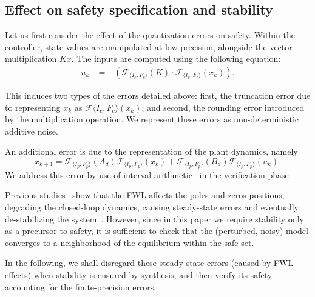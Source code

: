 \documentclass[twocolumn]{autart}    %
\begin{document}
\subsection{Effect on safety specification and stability}

Let us first consider the effect of the quantization errors on safety. 
Within the controller, state values are manipulated at low precision,
alongside the vector multiplication $Kx$.
The inputs are computed using the following equation: 
%
\begin{align*}
u_{k}&=-(\mathcal{F}_{\langle I_c,F_c \rangle}(K)\cdot\mathcal{F}_{\langle I_c,F_c \rangle}(x_{k})). 
\end{align*}

This induces two types of the errors detailed above: first, the truncation
error due to representing $x_k$ as $\mathcal{F}{\langle I_c,F_c
\rangle}(x_{k})$; and second, the rounding error introduced by the
multiplication operation.  We represent these errors as non-deterministic
additive noise.

An additional error is due to the representation of the plant dynamics, namely 
%
{\scriptsize
\begin{equation}
x_{k+1} =\mathcal{F}_{\langle I_p,F_p \rangle}(A_d) \mathcal{F}_{\langle I_p,F_p \rangle}(x_{k}) + \mathcal{F}_{\langle I_p,F_p \rangle}(B_d)\mathcal{F}_{\langle I_p,F_p \rangle}(u_{k}).
\end{equation}
}
We address this error by use of interval
arithmetic~\cite{moore1966interval} in the verification phase.

Previous studies~\cite{gangli1} show that the FWL affects the poles and
zeros positions, degrading the closed-loop dynamics, causing steady-state
errors and eventually de-stabilizing the system~\cite{Bessa16}.  However,
since in this paper we require stability only as a precursor to safety, it
is sufficient to check that the (perturbed, noisy) model converges to a
neighborhood of the equilibrium within the safe set.

In the following, we shall disregard these steady-state errors (caused by
FWL effects) when stability is ensured by synthesis, and then verify its
safety accounting for the finite-precision errors.


\end{document}
